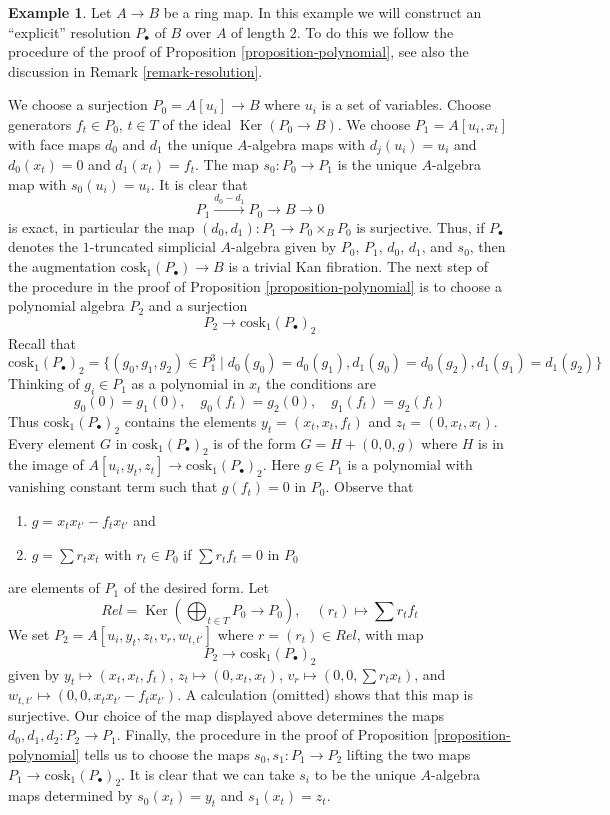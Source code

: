 \documentclass[10pt,a4paper]{article}
\theoremstyle{plain}
\theoremstyle{definition}
\newtheorem{example}[subsection]{Example}
\theoremstyle{remark}
\numberwithin{equation}{subsection}
\def\Ker{\mathop{\mathrm{Ker}}}
\begin{document}
\begin{example}
\label{example-resolution-length-two}
Let $A \to B$ be a ring map. In this example we 
will construct an ``explicit'' resolution $P_\bullet$ of $B$ over $A$ of
length $2$. To do this we follow the procedure of the proof of
Proposition \ref{proposition-polynomial}, see also the discussion in
Remark \ref{remark-resolution}.

\medskip\noindent
We choose a surjection $P_0 = A[u_i] \to B$ where $u_i$ is a set of
variables. Choose generators $f_t \in P_0$, $t \in T$ of the ideal
$\Ker(P_0 \to B)$. We choose $P_1 = A[u_i, x_t]$ with face maps
$d_0$ and $d_1$ the unique $A$-algebra maps with $d_j(u_i) = u_i$
and $d_0(x_t) = 0$ and $d_1(x_t) = f_t$. The map $s_0 : P_0 \to P_1$
is the unique $A$-algebra map with $s_0(u_i) = u_i$. It is clear that
$$
P_1 \xrightarrow{d_0 - d_1} P_0 \to B \to 0
$$
is exact, in particular the map $(d_0, d_1) : P_1 \to P_0 \times_B P_0$
is surjective. Thus, if $P_\bullet$ denotes the $1$-truncated
simplicial $A$-algebra given by $P_0$, $P_1$, $d_0$, $d_1$, and $s_0$, then
the augmentation $\text{cosk}_1(P_\bullet) \to B$ is a trivial Kan fibration.
The next step of the procedure in the proof of
Proposition \ref{proposition-polynomial}
is to choose a polynomial algebra $P_2$ and a surjection
$$
P_2 \longrightarrow \text{cosk}_1(P_\bullet)_2
$$
Recall that
$$
\text{cosk}_1(P_\bullet)_2 =
\{(g_0, g_1, g_2) \in P_1^3 \mid d_0(g_0) = d_0(g_1),
d_1(g_0) = d_0(g_2), d_1(g_1) = d_1(g_2)\}
$$
Thinking of $g_i \in P_1$ as a polynomial in $x_t$ the conditions
are
$$
g_0(0) = g_1(0),\quad
g_0(f_t) = g_2(0),\quad
g_1(f_t) = g_2(f_t)
$$
Thus $\text{cosk}_1(P_\bullet)_2$ contains the elements
$y_t = (x_t, x_t, f_t)$ and $z_t = (0, x_t, x_t)$.
Every element $G$ in $\text{cosk}_1(P_\bullet)_2$ is
of the form $G = H + (0, 0, g)$ where $H$ is in the image
of $A[u_i, y_t, z_t] \to \text{cosk}_1(P_\bullet)_2$. Here
$g \in P_1$ is a polynomial with vanishing
constant term such that $g(f_t) = 0$ in $P_0$. Observe that
\begin{enumerate}
\item $g = x_t x_{t'} - f_t x_{t'}$ and
\item $g = \sum r_t x_t$ with $r_t \in P_0$ if $\sum r_t f_t = 0$ in $P_0$
\end{enumerate}
are elements of $P_1$ of the desired form. Let
$$
Rel = \Ker(\bigoplus\nolimits_{t \in T} P_0 \longrightarrow P_0),\quad
(r_t) \longmapsto \sum r_tf_t
$$
We set $P_2 = A[u_i, y_t, z_t, v_r, w_{t, t'}]$ where
$r = (r_t) \in Rel$, with map
$$
P_2 \longrightarrow \text{cosk}_1(P_\bullet)_2
$$
given by $y_t  \mapsto (x_t, x_t, f_t)$,
$z_t \mapsto (0, x_t, x_t)$,
$v_r \mapsto (0, 0, \sum r_t x_t)$, and
$w_{t, t'} \mapsto (0, 0, x_t x_{t'} - f_t x_{t'})$. A calculation
(omitted) shows that this map is surjective. Our choice of the
map displayed above determines the maps $d_0, d_1, d_2 : P_2 \to P_1$.
Finally, the procedure in the proof of
Proposition \ref{proposition-polynomial}
tells us to choose the maps $s_0, s_1 : P_1 \to P_2$ lifting the two
maps $P_1 \to \text{cosk}_1(P_\bullet)_2$. It is clear that we can take
$s_i$ to be the unique $A$-algebra maps determined by
$s_0(x_t) = y_t$ and $s_1(x_t) = z_t$.
\end{example}
\end{document}
